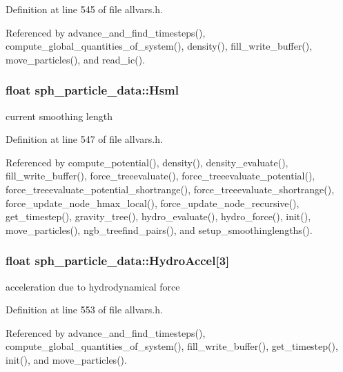 Definition at line 545 of file allvars.h.



Referenced by advance\_\-and\_\-find\_\-timesteps(), compute\_\-global\_\-quantities\_\-of\_\-system(), density(), fill\_\-write\_\-buffer(), move\_\-particles(), and read\_\-ic().

\hypertarget{structsph__particle__data_af9efa599cdd656b26a0df5f89430b4d1}{
\subsubsection[{Hsml}]{\setlength{\rightskip}{0pt plus 5cm}float {\bf sph\_\-particle\_\-data::Hsml}}}
\label{structsph__particle__data_af9efa599cdd656b26a0df5f89430b4d1}
current smoothing length 

Definition at line 547 of file allvars.h.



Referenced by compute\_\-potential(), density(), density\_\-evaluate(), fill\_\-write\_\-buffer(), force\_\-treeevaluate(), force\_\-treeevaluate\_\-potential(), force\_\-treeevaluate\_\-potential\_\-shortrange(), force\_\-treeevaluate\_\-shortrange(), force\_\-update\_\-node\_\-hmax\_\-local(), force\_\-update\_\-node\_\-recursive(), get\_\-timestep(), gravity\_\-tree(), hydro\_\-evaluate(), hydro\_\-force(), init(), move\_\-particles(), ngb\_\-treefind\_\-pairs(), and setup\_\-smoothinglengths().

\hypertarget{structsph__particle__data_aa3441b1ee8351048b3dcac10b36b0b6c}{
\subsubsection[{HydroAccel}]{\setlength{\rightskip}{0pt plus 5cm}float {\bf sph\_\-particle\_\-data::HydroAccel}\mbox{[}3\mbox{]}}}
\label{structsph__particle__data_aa3441b1ee8351048b3dcac10b36b0b6c}
acceleration due to hydrodynamical force 

Definition at line 553 of file allvars.h.



Referenced by advance\_\-and\_\-find\_\-timesteps(), compute\_\-global\_\-quantities\_\-of\_\-system(), fill\_\-write\_\-buffer(), get\_\-timestep(), init(), and move\_\-particles().

